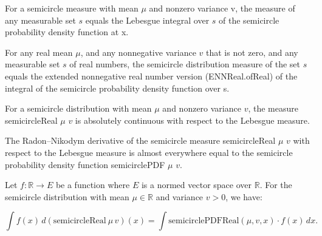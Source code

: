 \begin{lemma}
    \label{lemma:semicircleReal_apply}
    \leanok
    For a semicircle measure with mean $\mu$ and nonzero variance v, the measure of any measurable set $s$ equals the Lebesgue integral over $s$ of the semicircle probability density function at x.
\end{lemma}

\begin{lemma}
    \label{lemma:semicircleReal_apply_eq_integral}
    \leanok
    For any real mean $\mu$, and any nonnegative variance $v$ that is not zero, and any measurable set $s$ of real numbers, the semicircle distribution measure of the set $s$ equals the extended nonnegative real number version (ENNReal.ofReal) of the integral of the semicircle probability density function over s.
\end{lemma}

\begin{lemma}
    \label{lemma:semicircleReal_absolutelyContinuous}
    \leanok
    For a semicircle distribution with mean $\mu$ and nonzero variance $v$, the measure semicircleReal $μ$ $v$ is absolutely continuous with respect to the Lebesgue measure.
\end{lemma}

\begin{lemma}
    \label{lemma:rnDeriv_semicircleReal}
    \leanok
    The Radon–Nikodym derivative of the semicircle measure semicircleReal $\mu$ $v$ with respect to the Lebesgue measure is almost everywhere equal to the semicircle probability density function semicirclePDF $\mu$ $v$.
\end{lemma}

\begin{lemma}
    \label{lemma:intergral_semicircleReal_eq_integral_smul}
    \leanok

    Let $ f : \mathbb{R} \to E $ be a function where $ E $ is a normed vector space over $\mathbb{R}$. For the semicircle distribution with mean $\mu \in \mathbb{R}$ and variance $ v > 0 $, we have:

    \[
    \int f(x) \, d(\mathrm{semicircleReal}\ \mu\, v)(x) = \int \mathrm{semicirclePDFReal}(\mu, v, x) \cdot f(x) \, dx.
    \]
    
    
\end{lemma}


